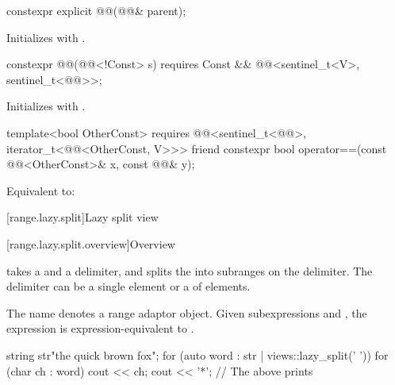 \begin{itemdecl}
constexpr explicit @@(@@& parent);
\end{itemdecl}

\begin{itemdescr}
\pnum
\effects
Initializes  with .
\end{itemdescr}

\begin{itemdecl}
constexpr @@(@@<!Const> s)
  requires Const && @@<sentinel_t<V>, sentinel_t<@@>>;
\end{itemdecl}

\begin{itemdescr}
\pnum
\effects
Initializes  with .
\end{itemdescr}

\begin{itemdecl}
template<bool OtherConst>
  requires @@<sentinel_t<@@>, iterator_t<@@<OtherConst, V>>>
friend constexpr bool operator==(const @@<OtherConst>& x, const @@& y);
\end{itemdecl}

\begin{itemdescr}
\pnum
\effects
Equivalent to: 
\end{itemdescr}

[range.lazy.split]{Lazy split view}

[range.lazy.split.overview]{Overview}

\pnum
{} takes a  and a delimiter, and splits
the  into subranges on the delimiter. The delimiter can be
a single element or a  of elements.

\pnum
{}%
The name  denotes a
range adaptor object.
Given subexpressions  and ,
the expression  is expression-equivalent to
.

\pnum
\begin{example}
\begin{codeblock}
string str{"the quick brown fox"};
for (auto word : str | views::lazy_split(' ')) {
  for (char ch : word)
    cout << ch;
  cout << '*';
}
// The above prints 
\end{codeblock}
\end{example}

